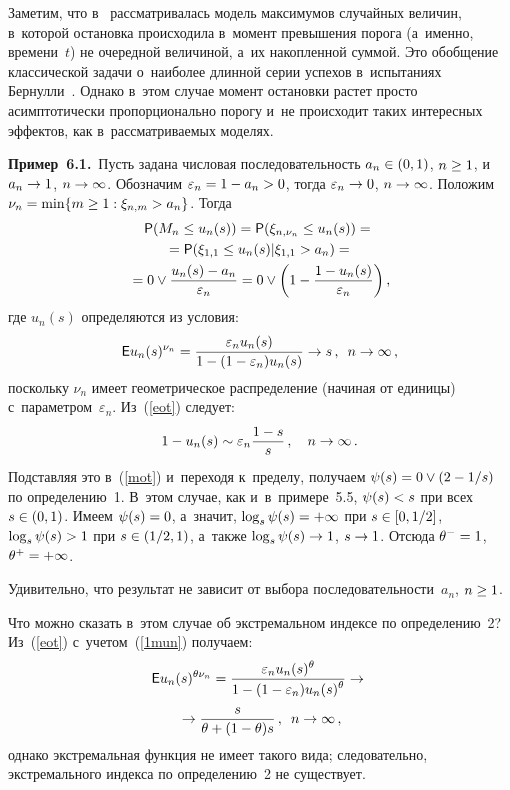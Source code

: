 \begin{multicols}{2}
Заметим, что в~\cite{Novak-2013, Novak-1991} рассматривалась модель максимумов
случайных величин, в~которой остановка
происходила в~момент превышения порога (а~именно, времени~$t$) не очередной
величиной, а~их накопленной суммой. Это обобщение классической задачи о~наиболее
длинной серии успехов в~испытаниях Бернулли~\cite[\S 8.5]{EKM}. Однако в~этом случае
момент остановки растет просто асимптотически пропорционально порогу
и~не происходит таких интересных эффектов, как в~рас\-смат\-ри\-ва\-емых моделях.

\smallskip

\noindent
\textbf{Пример~6.1.}\
Пусть задана числовая последовательность
$a_n\hm\in (0,1)$, $n\hm\ge 1$, и~$a_n\hm\to 1$, $n\hm\to \infty$.
Обозначим $\varepsilon_n\hm=1\hm-a_n\hm>0$, тогда
$\varepsilon_n\hm\to 0$, $n\hm\to\infty$.
Положим $\nu_n\hm=\min\{m\ge 1: \xi_{n,m}>a_n\}$. Тогда
\begin{multline}
\label{mot}
{\sf P}(M_n\le u_n(s))=
{\sf P}(\xi_{n,\nu_n}\le u_n(s))={}\\
{}=
{\sf P}(\xi_{1,1}\le u_n(s)|\xi_{1,1}>a_n)={}\\
{}=0\vee \displaystyle\frac{\displaystyle u_n(s)-a_n\mathstrut}{\displaystyle \varepsilon_n\mathstrut}=0\vee \left(1-\displaystyle\frac{\displaystyle 1-u_n(s)\mathstrut}{\displaystyle \varepsilon_n\mathstrut}\right),
\end{multline}
где $u_n(s)$ определяются из условия:
\begin{equation}
\label{eot}
{\sf E}u_n(s)^{\nu_n}=
\displaystyle\frac{\displaystyle \varepsilon_n u_n(s)\mathstrut}{\displaystyle 1-(1-\varepsilon_n)u_n(s)\mathstrut}\to s\,,\enskip n\to\infty\,,
\end{equation}
поскольку $\nu_n$ имеет геометрическое распределение
(начиная от единицы) с~параметром~$\varepsilon_n$.
Из~(\ref{eot}) следует:
\begin{equation}
\label{1mun}
1-u_n(s)\sim \varepsilon_n\displaystyle\frac{\displaystyle 1-s\mathstrut}{\displaystyle s\mathstrut}\,,\quad n\to\infty\,.
\end{equation}
Подставляя это в~(\ref{mot}) и~переходя к~пределу, получаем
$\psi(s)\hm=0\vee (2-1/s)$ по определению~1. В~этом случае, как
и~в~примере~5.5, $\psi(s)\hm<s$ при всех $s\hm\in (0,1)$. Имеем $\psi(s)\hm=0$,
а~значит, $\log_s\psi(s)\hm=+\infty$ при $s\hm\in [0,1/2]$,
$\log_s\psi(s)\hm>1$ при $s\hm\in (1/2,1)$, а~также $\log_s\psi(s)\hm\to 1$,
$s\hm\to 1$. Отсюда $\theta^-\hm=1$, $\theta^+\hm=+\infty$.

Удивительно, что результат не зависит от выбора
последовательности~$a_n$, $n\hm\ge 1$.

Что можно сказать в~этом случае об экстремальном индексе по определению~2?
Из~(\ref{eot}) с~учетом~(\ref{1mun}) получаем:
\begin{multline*}
{\sf E}u_n(s)^{\theta\nu_n}=
\displaystyle\frac{\displaystyle \varepsilon_n u_n(s)^\theta\mathstrut}{\displaystyle 1-(1-\varepsilon_n)u_n(s)^\theta\mathstrut}\to{}\\
{}\to
\displaystyle\frac{\displaystyle s\mathstrut}{\displaystyle \theta+(1-\theta)s\mathstrut}\,,\enskip n\to\infty\,,
\end{multline*}
однако экстремальная функция не имеет такого вида; следовательно,
экстремального индекса по определению~2 не существует.


\end{multicols}
